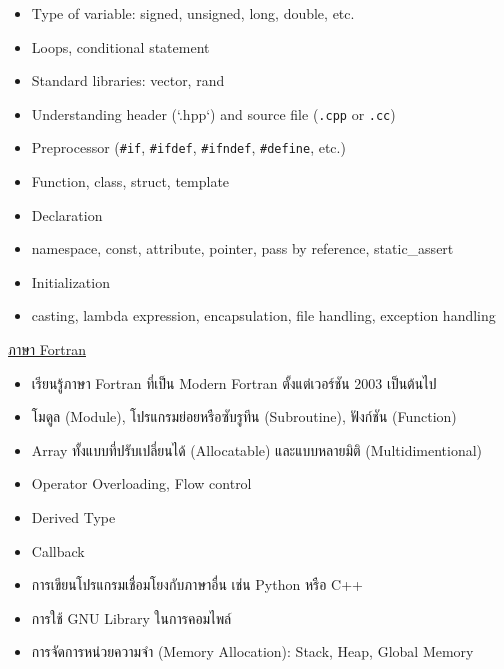 \begin{itemize}[topsep=0pt]
  \item Type of variable: signed, unsigned, long, double, etc.

  \item Loops, conditional statement

  \item Standard libraries: vector, rand

  \item Understanding header (`.hpp`) and source file (\texttt{.cpp} or \texttt{.cc})

  \item Preprocessor (\texttt{\#if}, \texttt{\#ifdef}, \texttt{\#ifndef}, \texttt{\#define}, etc.)

  \item Function, class, struct, template

  \item Declaration

  \item namespace, const, attribute, pointer, pass by reference, static_assert

  \item Initialization

  \item casting, lambda expression, encapsulation, file handling, exception handling
\end{itemize}

\noindent \underline{ภาษา Fortran}

\begin{itemize}[topsep=0pt]
  \item เรียนรู้ภาษา Fortran ที่เป็น Modern Fortran ตั้งแต่เวอร์ชัน 2003 เป็นต้นไป

  \item โมดูล (Module), โปรแกรมย่อยหรือซับรูทีน (Subroutine), ฟังก์ชัน (Function)

  \item Array ทั้งแบบที่ปรับเปลี่ยนได้ (Allocatable) และแบบหลายมิติ (Multidimentional)

  \item Operator Overloading, Flow control

  \item Derived Type

  \item Callback

  \item การเขียนโปรแกรมเชื่อมโยงกับภาษาอื่น เช่น Python หรือ C++

  \item การใช้ GNU Library ในการคอมไพล์

  \item การจัดการหน่วยความจำ (Memory Allocation): Stack, Heap, Global Memory
\end{itemize}

